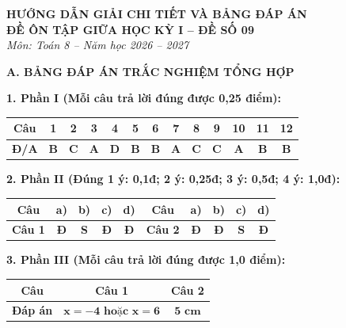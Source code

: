 \documentclass[12pt,a4paper]{article}
\begin{document}
\begin{center}
  \textbf{\Large HƯỚNG DẪN GIẢI CHI TIẾT VÀ BẢNG ĐÁP ÁN}\\
  \textbf{\large ĐỀ ÔN TẬP GIỮA HỌC KỲ I -- ĐỀ SỐ 09}\\
  \textit{Môn: Toán 8 -- Năm học 2026 -- 2027}
\end{center}
\vspace{2mm}

\noindent\textbf{\large A. BẢNG ĐÁP ÁN TRẮC NGHIỆM TỔNG HỢP}
\vspace{1mm}

\noindent\textbf{1. Phần I (Mỗi câu trả lời đúng được 0,25 điểm):}
\begin{center}
\begin{tabular}{|c|c|c|c|c|c|c|c|c|c|c|c|c|}
\hline
\textbf{Câu} & \textbf{1} & \textbf{2} & \textbf{3} & \textbf{4} & \textbf{5} & \textbf{6} & \textbf{7} & \textbf{8} & \textbf{9} & \textbf{10} & \textbf{11} & \textbf{12} \\
\hline
\textbf{Đ/A} & \textbf{B} & \textbf{C} & \textbf{A} & \textbf{D} & \textbf{B} & \textbf{B} & \textbf{A} & \textbf{C} & \textbf{C} & \textbf{A} & \textbf{B} & \textbf{B} \\
\hline
\end{tabular}
\end{center}
\vspace{0.5mm}

\noindent\textbf{2. Phần II (Đúng 1 ý: 0,1đ; 2 ý: 0,25đ; 3 ý: 0,5đ; 4 ý: 1,0đ):}
\begin{center}
\begin{tabular}{|c|c|c|c|c||c|c|c|c|c|}
\hline
\textbf{Câu} & \textbf{a)} & \textbf{b)} & \textbf{c)} & \textbf{d)} & \textbf{Câu} & \textbf{a)} & \textbf{b)} & \textbf{c)} & \textbf{d)} \\
\hline
\textbf{Câu 1} & \textbf{Đ} & \textbf{S} & \textbf{Đ} & \textbf{Đ} & \textbf{Câu 2} & \textbf{Đ} & \textbf{Đ} & \textbf{S} & \textbf{Đ} \\
\hline
\end{tabular}
\end{center}
\vspace{0.5mm}

\noindent\textbf{3. Phần III (Mỗi câu trả lời đúng được 1,0 điểm):}
\begin{center}
\begin{tabular}{|c|c|c|}
\hline
\textbf{Câu} & \textbf{Câu 1} & \textbf{Câu 2} \\
\hline
\textbf{Đáp án} & $\mathbf{x = -4 \text{ hoặc } x = 6}$ & $\mathbf{5\text{ cm}}$ \\
\hline
\end{tabular}
\end{center}
\vspace{1.5mm}
\end{document}
